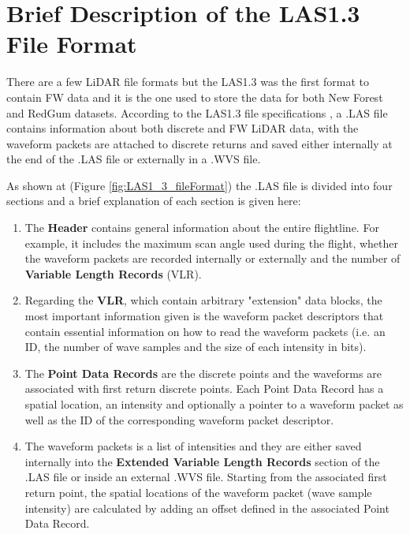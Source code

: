 \documentclass{subfiles}
\begin{document}
     
    \section{Brief Description of the LAS1.3 File Format} \label{sec:LAS1_3_specifications}
    
    \par There are a few LiDAR file formats but the LAS1.3 was the first format to contain FW data and it is the one used to store the data for both  New Forest and RedGum datasets. According to the LAS1.3 file specifications \cite{LAS1.3specifications}, a .LAS file contains information about both discrete and FW LiDAR data, with the waveform packets are attached to discrete returns and saved either internally at the end of the .LAS file or externally in a .WVS file. 
    
    \par As shown at (Figure \ref{fig:LAS1_3_fileFormat}) the .LAS file is divided into four sections and a brief explanation of each section is given here:
    \begin{enumerate}
    \item  The \textbf{Header} contains general information about the entire flightline. For example, it includes the maximum scan angle used during the flight, whether the waveform packets are recorded internally or externally  and the number of \textbf{Variable Length Records} (VLR). 
    \item Regarding the \textbf{VLR}, which contain arbitrary "extension" data blocks, the most important information given is the waveform packet descriptors that contain essential information on how to read the waveform packets (i.e. an ID, the number of wave samples and the size of each intensity in bits). 
    \item The \textbf{Point Data Records} are the discrete points and the waveforms are associated with first return discrete points. Each Point Data Record has a spatial location, an intensity and optionally a pointer to a waveform packet as well as the ID of the corresponding waveform packet descriptor. 
    \item The waveform packets is a list of intensities and they are either saved internally into the \textbf{Extended Variable Length Records} section of the .LAS file or inside an external .WVS file. Starting from the associated first return point, the spatial locations of the waveform packet (wave sample intensity) are calculated by adding an offset defined in the associated Point Data Record. 
    \end{enumerate}  
    
\end{document}
